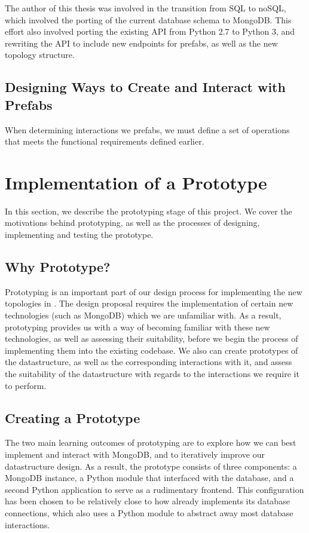 \documentclass[11pt]{article}
\begin{document}
		The author of this thesis was involved in the transition from SQL to noSQL, which involved the porting of the current database schema to MongoDB. 
		This effort also involved porting the existing \opendc{} API from Python 2.7 to Python 3, and rewriting the API to include new endpoints for prefabs, as well as the new topology structure.


	\subsection{Designing Ways to Create and Interact with Prefabs}
		When determining interactions we prefabs, we must define a set of operations that meets the functional requirements defined earlier.
		

\newpage

\section{Implementation of a Prototype} \label{sec:implementation}
	In this section, we describe the prototyping stage of this project.
	We cover the motivations behind prototyping, as well as the processes of designing, implementing and testing the prototype.
	\subsection{Why Prototype?}
		Prototyping is an important part of our design process for implementing the new topologies in \opendc{}.
		The design proposal requires the implementation of certain new technologies (such as MongoDB) which we are unfamiliar with.
		As a result, prototyping provides us with a way of becoming familiar with these new technologies, as well as assessing their suitability, before we begin the process of implementing them into the existing \opendc{} codebase.
		We also can create prototypes of the datastructure, as well as the corresponding interactions with it, and assess the suitability of the datastructure with regards to the interactions we require it to perform.
	
	\subsection{Creating a Prototype}
		The two main learning outcomes of prototyping are to explore how we can best implement and interact with MongoDB, and to iteratively improve our datastructure design.
		As a result, the prototype consists of three components: a MongoDB instance, a Python module that interfaced with the database, and a second Python application to serve as a rudimentary frontend. 
		This configuration has been chosen to be relatively close to how \opendc{} already implements its database connections, which also uses a Python module to abstract away most database interactions.
\end{document}
